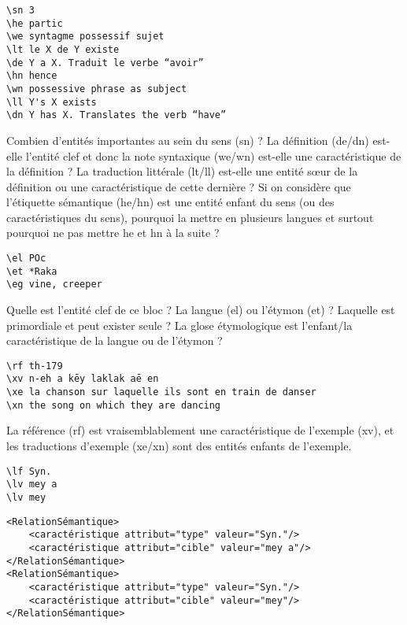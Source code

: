 \documentclass[10pt]{report}
\begin{document}
\begin{verbatim}
\sn 3
\he partic
\we syntagme possessif sujet
\lt le X de Y existe
\de Y a X. Traduit le verbe “avoir”
\hn hence
\wn possessive phrase as subject
\ll Y's X exists
\dn Y has X. Translates the verb “have”
\end{verbatim}

Combien d’entités importantes au sein du sens (sn) ? 
La définition (de/dn) est-elle l’entité clef et donc la note syntaxique (we/wn) est-elle une caractéristique de la définition ? La traduction littérale (lt/ll) est-elle une entité sœur de la définition ou une caractéristique de cette dernière ?
Si on considère que l’étiquette sémantique (he/hn) est une entité enfant du sens (ou des caractéristiques du sens), pourquoi la mettre en plusieurs langues et surtout pourquoi ne pas mettre he et hn à la suite ?

\bigskip

\begin{verbatim}
\el POc
\et *Raka
\eg vine, creeper
\end{verbatim}

Quelle est l’entité clef de ce bloc ? La langue (el) ou l’étymon (et) ? Laquelle est primordiale et peut exister seule ? La glose étymologique est l’enfant/la caractéristique de la langue ou de l’étymon ?

\bigskip

\begin{verbatim}
\rf th-179
\xv n-eh a kēy laklak aē en
\xe la chanson sur laquelle ils sont en train de danser
\xn the song on which they are dancing
\end{verbatim}

La référence (rf) est vraisemblablement une caractéristique de l’exemple (xv), et les traductions d’exemple (xe/xn) sont des entités enfants de l’exemple.

\bigskip

\begin{minipage}{0.2\linewidth}
\begin{verbatim}
\lf Syn.
\lv mey a
\lv mey
\end{verbatim}
\end{minipage}
\begin{minipage}{0.7\linewidth}
\begin{verbatim}
<RelationSémantique>
    <caractéristique attribut="type" valeur="Syn."/>
    <caractéristique attribut="cible" valeur="mey a"/>
</RelationSémantique>
<RelationSémantique>
    <caractéristique attribut="type" valeur="Syn."/>
    <caractéristique attribut="cible" valeur="mey"/>
</RelationSémantique>
\end{verbatim}	
\end{minipage}
\end{document}
